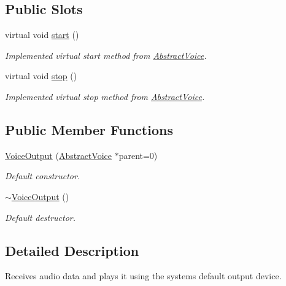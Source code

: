\subsection*{\-Public \-Slots}
\begin{DoxyCompactItemize}
\item 
virtual void \hyperlink{class_voice_output_ab73d7fc81805b8ba0d457db2fcf29ac4}{start} ()
\begin{DoxyCompactList}\small\item\em \-Implemented virtual start method from \hyperlink{class_abstract_voice}{\-Abstract\-Voice}. \end{DoxyCompactList}\item 
virtual void \hyperlink{class_voice_output_ad86ffb5732b221da79f5bfba04e7a35a}{stop} ()
\begin{DoxyCompactList}\small\item\em \-Implemented virtual stop method from \hyperlink{class_abstract_voice}{\-Abstract\-Voice}. \end{DoxyCompactList}\end{DoxyCompactItemize}
\subsection*{\-Public \-Member \-Functions}
\begin{DoxyCompactItemize}
\item 
\hyperlink{class_voice_output_a82e8a7dc2eb2de4520e1fbe7e0f71e30}{\-Voice\-Output} (\hyperlink{class_abstract_voice}{\-Abstract\-Voice} $\ast$parent=0)
\begin{DoxyCompactList}\small\item\em \-Default constructor. \end{DoxyCompactList}\item 
\hypertarget{class_voice_output_ab483f1f9a463ed3cd3e5fb265147e51e}{
\hyperlink{class_voice_output_ab483f1f9a463ed3cd3e5fb265147e51e}{$\sim$\-Voice\-Output} ()}
\label{class_voice_output_ab483f1f9a463ed3cd3e5fb265147e51e}

\begin{DoxyCompactList}\small\item\em \-Default destructor. \end{DoxyCompactList}\end{DoxyCompactItemize}


\subsection{\-Detailed \-Description}
\-Receives audio data and plays it using the systems default output device. 

